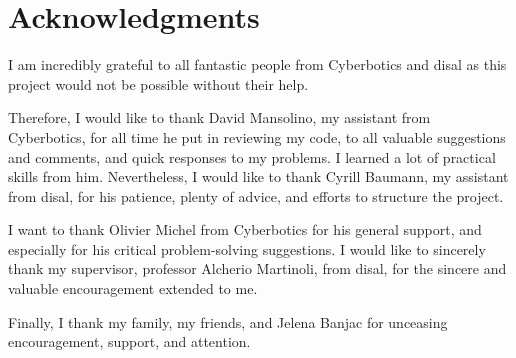 \section*{Acknowledgments}

I am incredibly grateful to all fantastic people from Cyberbotics and \ac{disal} as this project would not be possible without their help.

Therefore, I would like to thank David Mansolino, my assistant from Cyberbotics, for all time he put in reviewing my code, to all valuable suggestions and comments, and quick responses to my problems.
I learned a lot of practical skills from him.
Nevertheless, I would like to thank Cyrill Baumann, my assistant from \ac{disal}, for his patience, plenty of advice, and efforts to structure the project.

I want to thank Olivier Michel from Cyberbotics for his general support, and especially for his critical problem-solving suggestions.
I would like to sincerely thank my supervisor, professor Alcherio Martinoli, from \ac{disal}, for the sincere and valuable encouragement extended to me.

Finally, I thank my family, my friends, and Jelena Banjac for unceasing encouragement, support, and attention.
